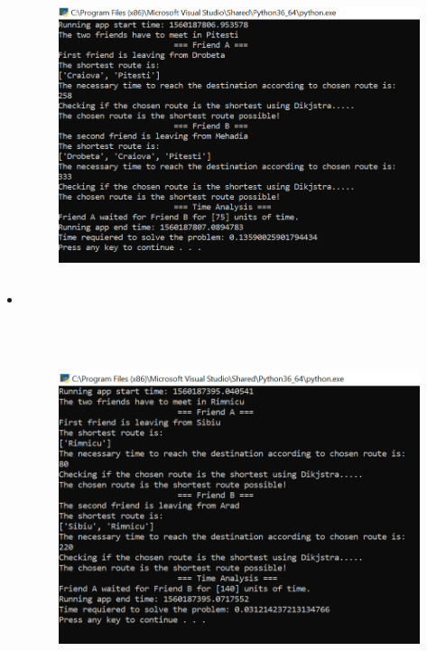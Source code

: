 \documentclass[12pt]{article}
\begin{document}
\begin{itemize}
	\item \par




\begin{figure}[H]
	\begin{Center}
		\includegraphics[width=5.55in,height=3.92in]{./media/image9.png}
	\end{Center}
\end{figure}



\begin{justify}
 
\end{justify}\par




\begin{figure}[H]
\advance\leftskip 0.6in		\includegraphics[width=5.73in,height=4.31in]{./media/image15.png}
\end{figure}



\end{itemize}
\end{document}
